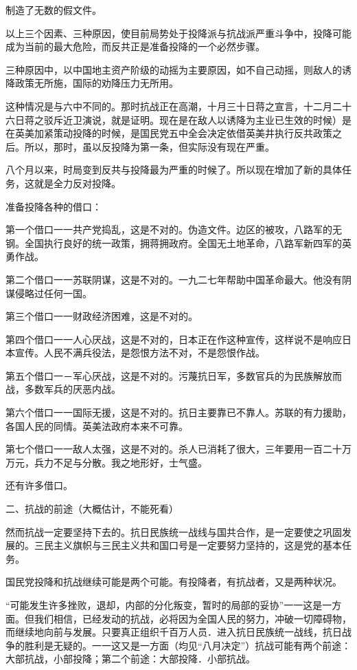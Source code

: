 制造了无数的假文件。

以上三个因素、三种原因，使目前局势处于投降派与抗战派严重斗争中，投降可能成为当前的最大危险，而反共正是准备投降的一个必然步骤。

三种原因中，以中国地主资产阶级的动摇为主要原因，如不自己动摇，则敌人的诱降政策无所施，国际的劝降压力无所用。

这种情况是与六中不同的。那时抗战正在高潮，十月三十日蒋之宣言，十二月二十六日蒋之驳斥近卫演说，就是证明。现在是在敌人以诱降为主业已生效的时候）是在英美加紧策动投降的时候，是国民党五中全会决定依借英美井执行反共政策之后。所以，那时，虽以反投降为第一条，但实际没有现在严重。

八个月以来，时局变到反共与投降最为严重的时候了。所以现在增加了新的具体任务，这就是全力反对投降。

准备投降各种的借口：

第一个借口一一共产党捣乱，这是不对的。伪造文件。边区的被攻，八路军的无钢。全国执行良好的统一政策，拥蒋拥政府。全国无土地革命，八路军新四军的英勇作战。

第二个借口一一苏联阴谋，这是不对的。一九二七年帮助中国革命最大。他没有阴谋侵略过任何一国。

第三个借口一一财政经济困难，这是不对的。

第四个借口一一人心厌战，这是不对的，日本正在作这种宣传，这样说不是响应日本宣传。人民不满兵役法，是怨恨方法不对，不是怨恨作战。

第五个借口一－军心厌战，这是不对的。污蔑抗日军，多数官兵的为民族解放而战，多数军兵的厌恶内战。

第六个借口一一国际无援，这是不对的。抗日主要靠已不靠人。苏联的有力援助，各国人民的同情。英美法政府本来不可靠。

第七个借口一一敌人太强，这是不对的。杀人已消耗了很大，三年要用一百二十万万元，兵力不足与分散。我之地形好，士气盛。

还有许多借口。

二、抗战的前途（大概估计，不能死看）

然而抗战一定要坚持下去的。抗日民族统一战线与国共合作，是一定要使之巩固发展的。三民主义旗帜与三民主义共和国口号是一定要努力坚持的，这是党的基本任务。

国民党投降和抗战继续可能是两个可能。有投降者，有抗战者，又是两种状况。

“可能发生许多挫败，退却，内部的分化叛变，暂时的局部的妥协”一一这是一方面。但我们相信，已经发动的抗战，必将因为全国人民的努力，冲破一切障碍物，而继续地向前与发展。只要真正组织千百万人员．进入抗日民族统一战线，抗日战争的胜利是无疑的。一一这又是一方面（均见“八月决定”）抗战可能有两个前途：大部抗战，小部投降；第二个前途：大部投降．小部抗战。

